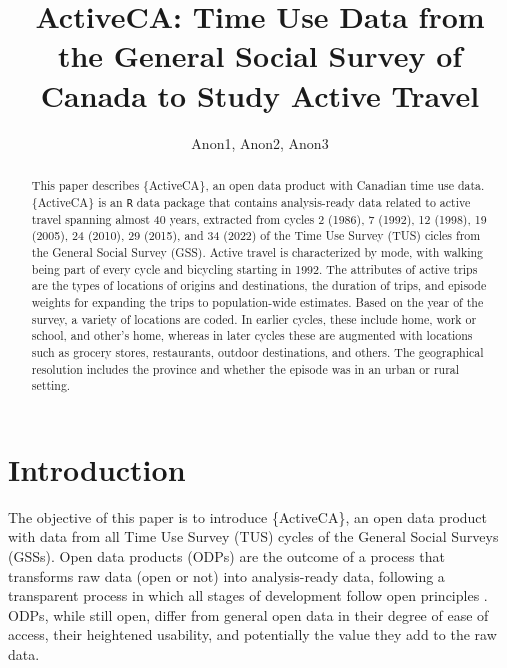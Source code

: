 \documentclass[Royal,times,sageh]{sagej}
\begin{document}

\title{ActiveCA: Time Use Data from the General Social Survey of Canada
to Study Active Travel}

\runninghead{}

\author{Anon1\affilnum{}, Anon2\affilnum{}, Anon3\affilnum{}}

\affiliation{\affilnum{}{}}



\begin{abstract}
This paper describes \{ActiveCA\}, an open data product with Canadian
time use data. \{ActiveCA\} is an \texttt{R} data package that contains
analysis-ready data related to active travel spanning almost 40 years,
extracted from cycles 2 (1986), 7 (1992), 12 (1998), 19 (2005), 24
(2010), 29 (2015), and 34 (2022) of the Time Use Survey (TUS) cicles
from the General Social Survey (GSS). Active travel is characterized by
mode, with walking being part of every cycle and bicycling starting in
1992. The attributes of active trips are the types of locations of
origins and destinations, the duration of trips, and episode weights for
expanding the trips to population-wide estimates. Based on the year of
the survey, a variety of locations are coded. In earlier cycles, these
include home, work or school, and other's home, whereas in later cycles
these are augmented with locations such as grocery stores, restaurants,
outdoor destinations, and others. The geographical resolution includes
the province and whether the episode was in an urban or rural setting.
\end{abstract}


\maketitle

\section{Introduction}\label{introduction}

The objective of this paper is to introduce \{ActiveCA\}, an open data
product with data from all Time Use Survey (TUS) cycles of the General
Social Surveys (GSSs). Open data products (ODPs) are the outcome of a
process that transforms raw data (open or not) into analysis-ready data,
following a transparent process in which all stages of development
follow open principles \citep{arribas-bel2021}. ODPs, while still open,
differ from general open data in their degree of ease of access, their
heightened usability, and potentially the value they add to the raw
data.
\end{document}
